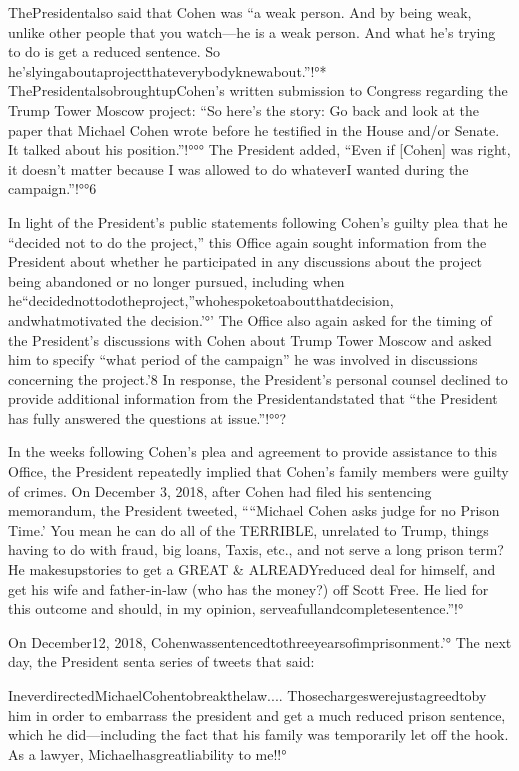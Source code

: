 ThePresidentalso said that Cohen was “a weak person.
And by being weak, unlike other people that you watch—he is a weak person.
And what he's trying to do is get a reduced sentence.
So he'slyingaboutaprojectthateverybodyknewabout.”!°*
ThePresidentalsobroughtupCohen's written submission to Congress regarding the Trump Tower Moscow project: “So here's the story: Go back and look at the paper that Michael Cohen wrote before he testified in the House and/or Senate.
It talked about his position.”!°°°
The President added, “Even if [Cohen] was right, it doesn't matter because I was allowed to do whateverI wanted during the campaign.”!°°6

In light of the President's public statements following Cohen's guilty plea that he “decided not to do the project,” this Office again sought information from the President about whether he participated in any discussions about the project being abandoned or no longer pursued, including when he“decidednottodotheproject,”whohespoketoaboutthatdecision, andwhatmotivated
the decision.'°'
The Office also again asked for the timing of the President's discussions with Cohen about Trump Tower Moscow and asked him to specify “what period of the campaign” he was involved in discussions concerning the project.'8
In response, the President's personal counsel declined to provide additional information from the Presidentandstated that “the President has fully answered the questions at issue.”!°°?

In the weeks following Cohen's plea and agreement to provide assistance to this Office, the President repeatedly implied that Cohen's family members were guilty of crimes.
On December 3, 2018, after Cohen had filed his sentencing memorandum, the President tweeted, ““Michael Cohen asks judge for no Prison Time.'
You mean he can do all of the TERRIBLE, unrelated to Trump, things having to do with fraud, big loans, Taxis, etc., and not serve a long prison term?
He makesupstories to get a GREAT & ALREADYreduced deal for himself, and get his wife and father-in-law (who has the money?) off Scott Free.
He lied for this outcome and should, in my opinion, serveafullandcompletesentence.”!°

On December12, 2018, Cohenwassentencedtothreeyearsofimprisonment.'°
The next day, the President senta series of tweets that said:

IneverdirectedMichaelCohentobreakthelaw....
Thosechargeswerejustagreedtoby him in order to embarrass the president and get a much reduced prison sentence, which he did—including the fact that his family was temporarily let off the hook.
As a lawyer, Michaelhasgreatliability to me!!°


